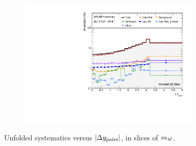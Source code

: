 \begin{figure}[hp]
    \begin{subfigure}{.49\textwidth}\centering\includegraphics[width = 0.95\textwidth]{Figures/m4l/Systematics/Unfolded/UnfoldedSys_dYpairs_vs_M4l_Stack_Paper3.pdf}\end{subfigure}
    \caption{Unfolded systematics versus $|\Delta y_{\text{pairs}}|$, in slices of $m_{4\ell}$.}
\end{figure}

